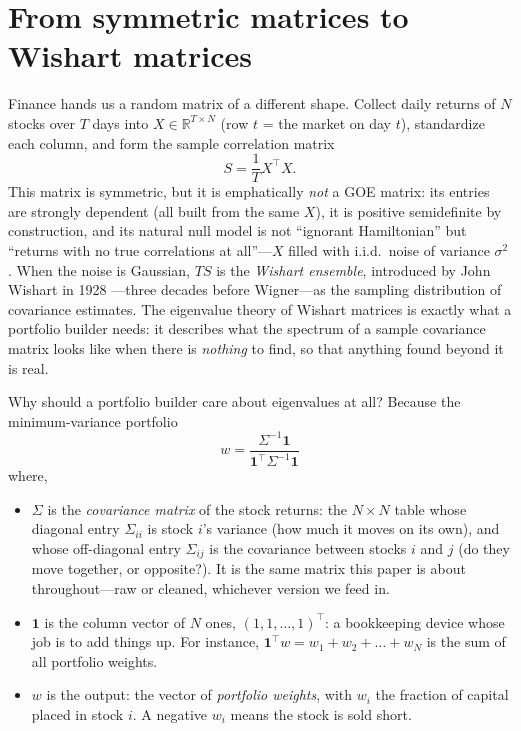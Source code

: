 \documentclass[11pt]{article}
\begin{document}
\section{From symmetric matrices to Wishart matrices}
\label{sec:wishart}

Finance hands us a random matrix of a different shape. Collect daily
returns of $N$ stocks over $T$ days into $X\in\mathbb R^{T\times N}$ (row
$t$ = the market on day $t$), standardize each column, and form the sample
correlation matrix
\begin{equation}
S=\frac{1}{T}X^{\top}X.
\label{eq:S}
\end{equation}
This matrix is symmetric, but it is emphatically \emph{not} a GOE matrix:
its entries are strongly dependent (all built from the same $X$), it is
positive semidefinite by construction, and its natural null model is not
``ignorant Hamiltonian'' but ``returns with no true correlations at
all''---$X$ filled with i.i.d.\ noise of variance $\sigma^{2}$. When the
noise is Gaussian, $TS$ is the \emph{Wishart ensemble}, introduced by John
Wishart in 1928 \cite{wishart1928}---three decades before Wigner---as the
sampling distribution of covariance estimates. The eigenvalue theory of
Wishart matrices is exactly what a portfolio builder needs: it describes
what the spectrum of a sample covariance matrix looks like when there is
\emph{nothing} to find, so that anything found beyond it is real.

Why should a portfolio builder care about eigenvalues at all? Because the
minimum-variance portfolio
\begin{equation}
w=\frac{\Sigma^{-1}\mathbf 1}{\mathbf 1^{\top}\Sigma^{-1}\mathbf 1}
\label{eq:gmv}
\end{equation}
where,
\begin{itemize}
\item $\Sigma$ is the \emph{covariance matrix} of the stock returns: the
$N\times N$ table whose diagonal entry $\Sigma_{ii}$ is stock $i$'s
variance (how much it moves on its own), and whose off-diagonal entry
$\Sigma_{ij}$ is the covariance between stocks $i$ and $j$ (do they move
together, or opposite?). It is the same matrix this paper is about
throughout---raw or cleaned, whichever version we feed in.
\item $\mathbf 1$ is the column vector of $N$ ones,
$(1,1,\dots,1)^{\top}$: a bookkeeping device whose job is to add things
up. For instance, $\mathbf 1^{\top}w = w_1 + w_2 + \dots + w_N$ is the
sum of all portfolio weights.
\item $w$ is the output: the vector of \emph{portfolio weights}, with
$w_i$ the fraction of capital placed in stock $i$. A negative $w_i$
means the stock is sold short.
\end{itemize}
\end{document}
